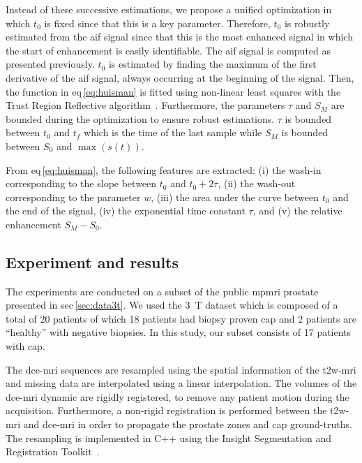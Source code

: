 Instead of these successive estimations, we propose a unified optimization in which $t_0$ is fixed since that this is a key parameter.
Therefore, $t_0$ is robustly estimated from the \ac{aif} signal since that this is the most enhanced signal in which the start of enhancement is easily identifiable.
The \ac{aif} signal is computed as presented previously.
$t_0$ is estimated by finding the maximum of the first derivative of the \ac{aif} signal, always occurring at the beginning of the signal.
Then, the function in \acs{eq}\,\eqref{eq:huisman} is fitted using non-linear least squares with the Trust Region Reflective algorithm~\cite{sorensen1982newton}.
Furthermore, the parameters $\tau$ and $S_M$ are bounded during the optimization to ensure robust estimations.
$\tau$ is bounded between $t_0$ and $t_f$ which is the time of the last sample while $S_M$ is bounded between $S_0$ and $\max(s(t))$.


From \acs{eq}\,\eqref{eq:huisman}, the following features are extracted:
(i) the wash-in corresponding to the slope between $t_0$ and $t_0 + 2 \tau$,
(ii) the wash-out corresponding to the parameter $w$,
(iii) the area under the curve between $t_0$ and the end of the signal,
(iv) the exponential time constant $\tau$, and
(v) the relative enhancement $S_M - S_0$.


\subsection{Experiment and results}\label{subsec:chp5:DCE-norm:exp-res}


The experiments are conducted on a subset of the public \ac{mpmri} prostate presented in \acs{sec}\,\ref{sec:data3t}.
We used the \SI{3}{\tesla} dataset which is composed of a total of 20 patients of which 18 patients had biopsy proven \ac{cap} and 2 patients are ``healthy'' with negative biopsies. 
In this study, our subset consists of 17 patients with \ac{cap}.

The \ac{dce}-\ac{mri} sequences are resampled using the spatial information of the \ac{t2w}-\ac{mri} and missing data are interpolated using a linear interpolation.
The volumes of the \ac{dce}-\ac{mri} dynamic are rigidly registered, to remove any patient motion during the acquisition.
Furthermore, a non-rigid registration is performed between the \ac{t2w}-\ac{mri} and \ac{dce}-\ac{mri} in order to propagate the prostate zones and \ac{cap} ground-truths.
The resampling is implemented in C++ using the Insight Segmentation and Registration Toolkit~\cite{ibanez2005itk}.


